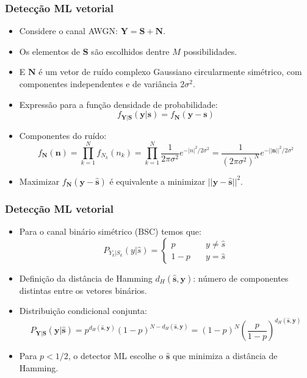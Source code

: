 \begin{frame}
	\frametitle{Detecção ML vetorial}

	\begin{itemize}
	    \item Considere o canal AWGN: $\mathbf{Y} = \mathbf{S} + \mathbf{N}$.
	    \item Os elementos de $\mathbf{S}$ são escolhidos dentre $M$ possibilidades.
	    \item E $\mathbf{N}$ é um vetor de ruído complexo Gaussiano circularmente simétrico, com componentes independentes e de variância $2\sigma^2$.
	    \item Expressão para a função densidade de probabilidade:
	    \begin{equation*}
		f_{\mathbf{Y}|\mathbf{S}}(\mathbf{y}|\mathbf{s}) = f_{\mathbf{N}}(\mathbf{y}-\mathbf{s})
	    \end{equation*}
	    \item Componentes do ruído:
	    \begin{equation*}
		f_{\mathbf{N}}(\mathbf{n}) = \prod_{k=1}^N f_{N_k}(n_k) = \prod_{k=1}^N \frac{1}{2\pi \sigma^2} e^{-|n|^2/2\sigma^2} = \frac{1}{(2\pi \sigma^2)^N} e^{-||\mathbf{n}||^2/2\sigma^2}
	    \end{equation*}
	    \item Maximizar $f_{\mathbf{N}}(\mathbf{y}-\hat{\mathbf{s}})$ é equivalente a minimizar $||\mathbf{y} - \hat{\mathbf{s}} ||^2$.
	\end{itemize}			
\end{frame}

\begin{frame}
	\frametitle{Detecção ML vetorial}

	\begin{itemize}
	    \item Para o canal binário simétrico (BSC) temos que:
	    \begin{equation*}
		P_{Y_k | S_k} (y|\hat{s}) = \begin{cases}
						p &\quad y \neq \hat{s} \\
						1-p &\quad y = \hat{s}
		                            \end{cases}
	    \end{equation*}
	    \item Definição da distância de Hamming $d_H(\hat{\mathbf{s}}, \mathbf{y})$: número de componentes distintas entre os vetores binários.
	    \item Distribuição condicional conjunta:
	    \begin{equation*}
		P_{\mathbf{Y} | \mathbf{S}} (\mathbf{y}|\hat{\mathbf{s}}) = p^{d_H(\hat{\mathbf{s}}, \mathbf{y})}(1-p)^{N - d_H(\hat{\mathbf{s}}, \mathbf{y})} = (1-p)^N \left(\frac{p}{1-p} \right)^{d_H(\hat{\mathbf{s}}, \mathbf{y})}
	    \end{equation*}
	    \item Para $p < 1/2$, o detector ML escolhe o $\hat{\mathbf{s}}$ que minimiza a distância de Hamming.
	\end{itemize}			
\end{frame}

